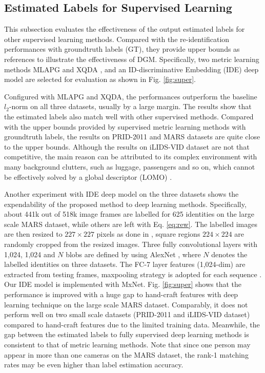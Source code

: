 \documentclass[10pt,twocolumn,letterpaper]{article}
\begin{document}
\subsection{Estimated Labels for Supervised Learning}\label{sec:exp_ml}
This subsection evaluates the effectiveness of the output estimated labels for other supervised learning methods. Compared with the re-identification performances with groundtruth labels (GT), they provide upper bounds as references to illustrate the effectiveness of DGM.
Specifically, two metric learning methods MLAPG \cite{iccv15liao} and XQDA \cite{cvpr15lomo}, and an ID-discriminative Embedding (IDE) deep model \cite{eccv16mars} are selected for evaluation as shown in Fig. \ref{fig:super}.

Configured with MLAPG and XQDA, the performances outperform the baseline $l_2$-norm on all three datasets, usually by a large margin. The results show that the estimated labels also match well with other supervised methods. Compared with the upper bounds provided by supervised metric learning methods with groundtruth labels, the results on PRID-2011 and MARS datasets are quite close to the upper bounds. Although the results on iLIDS-VID dataset are not that competitive, the main reason can be attributed to its complex environment with many background clutters, such as luggage, passengers and so on, which cannot be effectively solved by a global descriptor (LOMO) \cite{cvpr15lomo}.

Another experiment with IDE deep model on the three datasets shows the expendability of the proposed method to deep learning methods. Specifically, about 441k out of 518k image frames are labelled for 625 identities on the large scale MARS dataset, while others are left with Eq. \ref{eq:rew}. The labelled images are then resized to $227 \times 227$ pixels as done in \cite{eccv16mars}, square regions $224 \times 224$ are randomly cropped from the resized images. Three fully convolutional layers with 1,024, 1,024 and $N$ blobs are defined by using AlexNet \cite{nips12alex}, where $N$ denotes the labelled identities on three datasets. The FC-7 layer features (1,024-dim) are extracted from testing frames, maxpooling strategy is adopted for each sequence \cite{eccv16mars}. Our IDE model is implemented with MxNet. Fig. \ref{fig:super} shows that the performance is improved with a huge gap to hand-craft features with deep learning technique on the large scale MARS dataset. Comparably, it does not perform well on two small scale datasets (PRID-2011 and iLIDS-VID dataset) compared to hand-craft features due to the limited training data. Meanwhile, the gap between the estimated labels to fully supervised deep learning methods is consistent to that of metric learning methods. Note that since one person may appear in more than one cameras on the MARS dataset, the rank-1 matching rates may be even higher than label estimation accuracy.
\end{document}

